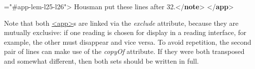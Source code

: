 \begin{shaded}
{\hspace*{1em}{exclude}="{\#app-lem-l25-l26}">}\mbox{}\newline 
{}\mbox{}\newline 
\hspace*{1em}\mbox{}\newline 
\hspace*{1em}\mbox{}\newline 
{}\mbox{}\newline 
{}Housman put these lines after 32.{</\textbf{note}>}\mbox{}\newline 
{</\textbf{app}>}\end{shaded}\egroup\par \noindent  Note that both \hyperref[TEI.app]{<app>}s are linked via the {\itshape exclude} attribute, because they are mutually exclusive: if one reading is chosen for display in a reading interface, for example, the other must disappear and vice versa. To avoid repetition, the second pair of lines can make use of the {\itshape copyOf} attribute. If they were both transposed and somewhat different, then both sets should be written in full.\par
